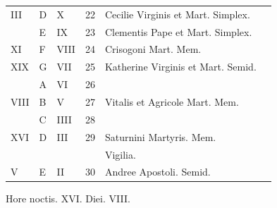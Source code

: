 \begin{center}
\begin{tabular}{l | l | l | r | l l}
\color{Red} III & D & \color{Red} X & 22 & \color{Red} Cecilie Virginis et Mart. Simplex. & \color{Red} \\
\color{Red}  & E & \color{Red} IX & 23 & Clementis Pape et Mart. Simplex. & \color{Red} \\
\color{Red} XI & F & \color{Red} VIII & 24 & Crisogoni Mart. Mem. & \color{Red} \\
\color{Red} XIX & G & \color{Red} VII & 25 & \color{Red} Katherine Virginis et Mart. Semid. \\
\color{Red}  & \color{Red} A & \color{Red} VI & 26 & & \color{Red} \\
\color{Red} VIII & B & \color{Red} V & 27 & Vitalis et Agricole Mart. Mem. & \color{Red} \\
\color{Red}  & C & \color{Red} IIII & 28 & & \color{Red} \\
\color{Red} XVI & D & \color{Red} III & 29 & \color{Red} Saturnini Martyris. Mem. & \\
& & & & \qquad \color{Red} Vigilia. \\
\color{Red} V & E & \color{Red} II & 30 & Andree Apostoli. Semid. & \color{Red} \\
\end{tabular}
\newline \color{Red} Hore noctis. XVI. Diei. VIII.
\end{center}



\newpage
\color{Red}\color{black}

